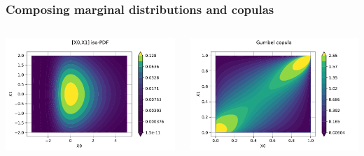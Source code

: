 \documentclass{beamer}
\begin{document}
\begin{frame}[containsverbatim]
\frametitle{Composing marginal distributions and copulas}

\begin{columns}

\begin{minipage}[t]{1.\textwidth}
    \includegraphics[width=.9\textwidth]{figures/Dist.pdf}

\end{minipage}

\begin{minipage}[t]{1.\textwidth}
    \includegraphics[width=.9\textwidth]{figures/Copula4.pdf}

\end{minipage}



\end{columns}
\end{frame}
\end{document}
